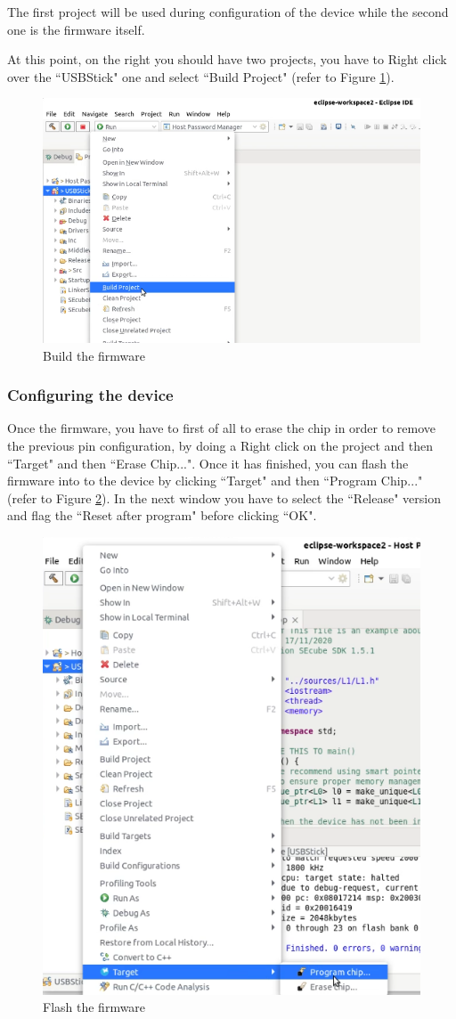 The first project will be used during configuration of the device while the second one is the firmware itself.

At this point, on the right you should have two projects, you have to Right click over the ``USBStick" one and select ``Build Project" (refer to Figure \ref{fig:setup10}).
\begin{figure}[H]
	\centering
	\includegraphics[width=0.55\linewidth]{images/firmware/setup_10}
	\caption{Build the firmware}
	\label{fig:setup10}
\end{figure}

\subsubsection{Configuring the device}
\label{sec:firm_configure}
Once the firmware, you have to first of all to erase the chip in order to remove the previous pin configuration, by doing a Right click on the project and then ``Target" and then ``Erase Chip...". Once it has finished, you can flash the firmware into to the device by clicking ``Target" and then ``Program Chip..." (refer to Figure \ref{fig:setup11}). In the next window you have to select the ``Release" version and flag the ``Reset after program" before clicking ``OK".

\begin{figure}[H]
	\centering
	\includegraphics[width=0.55\linewidth]{images/firmware/setup_11}
	\caption{Flash the firmware}
	\label{fig:setup11}
\end{figure}


